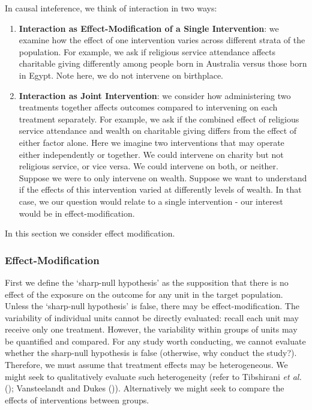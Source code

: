 \documentclass[
  single column]{article}
\begin{document}
In causal inteference, we think of interaction in two ways:

\begin{enumerate}
\def\labelenumi{\arabic{enumi}.}
\item
  \textbf{Interaction as Effect-Modification of a Single Intervention}:
  we examine how the effect of one intervention varies across different
  strata of the population. For example, we ask if religious service
  attendance affects charitable giving differently among people born in
  Australia versus those born in Egypt. Note here, we do not intervene
  on birthplace.
\item
  \textbf{Interaction as Joint Intervention}: we consider how
  administering two treatments together affects outcomes compared to
  intervening on each treatment separately. For example, we ask if the
  combined effect of religious service attendance and wealth on
  charitable giving differs from the effect of either factor alone. Here
  we imagine two interventions that may operate either independently or
  together. We could intervene on charity but not religious service, or
  vice versa. We could intervene on both, or neither. Suppose we were to
  only intervene on wealth. Suppose we want to understand if the effects
  of this intervention varied at differently levels of wealth. In that
  case, we our question would relate to a single intervention - our
  interest would be in effect-modification.
\end{enumerate}

In this section we consider effect modification.

\subsubsection{Effect-Modification}\label{effect-modification}

First we define the `sharp-null hypothesis' as the supposition that
there is no effect of the exposure on the outcome for any unit in the
target population. Unless the `sharp-null hypothesis' is false, there
may be effect-modification. The variability of individual units cannot
be directly evaluated: recall each unit may receive only one treatment.
However, the variability within groups of units may be quantified and
compared. For any study worth conducting, we cannot evaluate whether the
sharp-null hypothesis is false (otherwise, why conduct the study?).
Therefore, we must assume that treatment effects may be heterogeneous.
We might seek to qualitatively evaluate such heterogeneity (refer to
Tibshirani \emph{et al.} (); Vansteelandt
and Dukes ()). Alternatively we
might seek to compare the effects of interventions between groups.
\end{document}

